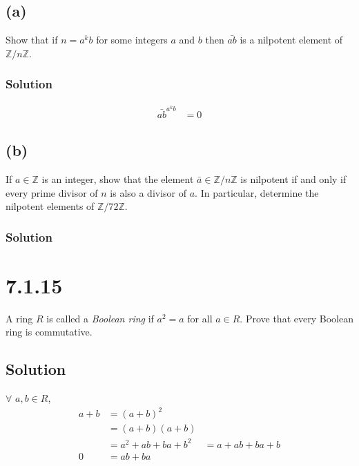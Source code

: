 \documentclass[fleqn]{article}
\begin{document}
        \subsection{(a)}
        Show that if $n = a^k b$ for some integers $a$ and $b$ then $\bar{ab}$ is a nilpotent element of $\mathbb{Z}/n\mathbb{Z}$.
            
            \subsubsection{Solution}
            \begin{align}
                \bar{ab}^{a^k b} &= 0
            \end{align}
        
        \subsection{(b)}
        If $a \in \mathbb{Z}$ is an integer, show that the element $\bar{a} \in \mathbb{Z}/n\mathbb{Z}$ is nilpotent if and only if every prime divisor of $n$ is also a divisor of $a$.  In particular, determine the nilpotent elements of $\mathbb{Z}/72\mathbb{Z}$.
        
            \subsubsection{Solution}
            
    
    \section{7.1.15}
    A ring $R$ is called a \textit{Boolean ring} if $a^2 = a$ for all $a \in R$.  Prove that every Boolean ring is commutative.
        
        \subsection{Solution}
        $\forall$ $a, b \in R$,
        \begin{align}
            a + b &= (a + b)^2 \\
                &= (a + b)(a + b) \\
                &= a^2 + ab + ba + b^2
                &= a + ab + ba + b \\
            0 &= ab + ba \\
        \end{align}
        
\end{document}
